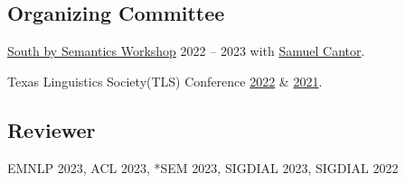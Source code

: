 \subsection{Organizing Committee}

\quad \href{https://sites.utexas.edu/sxsemantics}{South by Semantics Workshop} 2022 -- 2023 with \href{https://www.cantwolf.com}{Samuel Cantor}.

\quad Texas Linguistics Society(TLS) Conference \href{http://tls.ling.utexas.edu/2022/}{2022} \& \href{http://tls.ling.utexas.edu/2021/}{2021}.

\subsection{Reviewer}

\quad EMNLP 2023, ACL 2023, *SEM 2023, SIGDIAL 2023, SIGDIAL 2022
